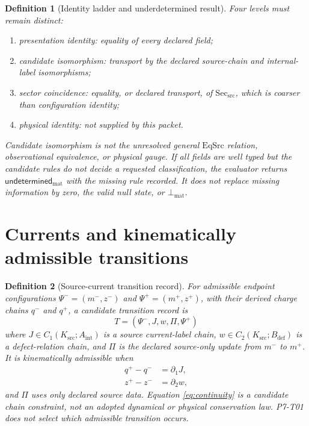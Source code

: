 \documentclass[11pt]{article}
\newtheorem{definition}{Definition}
\newcommand{\Ksrc}{K_{\mathrm{src}}}
\newcommand{\Aint}{A_{\mathrm{int}}}
\newcommand{\Bdef}{B_{\mathrm{def}}}
\newcommand{\Sect}{\mathrm{Sec}_{\mathrm{src}}}
\newcommand{\Malformed}{\bot_{\mathrm{mat}}}
\newcommand{\Undetermined}{\mathsf{undetermined}_{\mathrm{mat}}}
\begin{document}
\begin{definition}[Identity ladder and underdetermined result]
Four levels must remain distinct:
\begin{enumerate}[leftmargin=*]
\item \emph{presentation identity}: equality of every declared field;
\item \emph{candidate isomorphism}: transport by the declared source-chain
  and internal-label isomorphisms;
\item \emph{sector coincidence}: equality, or declared transport, of
  \(\Sect\), which is coarser than configuration identity;
\item \emph{physical identity}: not supplied by this packet.
\end{enumerate}
Candidate isomorphism is not the unresolved general
\(\mathrm{EqSrc}\) relation, observational equivalence, or physical gauge.
If all fields are well typed but the candidate rules do not decide a requested
classification, the evaluator returns \(\Undetermined\) with the missing rule
recorded. It does not replace missing information by zero, the valid null
state, or \(\Malformed\).
\end{definition}

\section{Currents and kinematically admissible transitions}

\begin{definition}[Source-current transition record]
For admissible endpoint configurations
\(\Psi^-=(m^-,z^-)\) and
\(\Psi^+=(m^+,z^+)\), with their derived charge chains \(q^-\) and
\(q^+\), a candidate transition record is
\[
  T=(\Psi^-,J,w,\Pi,\Psi^+)
\]
where \(J\in C_1(\Ksrc;\Aint)\) is a source current-label chain,
\(w\in C_2(\Ksrc;\Bdef)\) is a defect-relation chain, and \(\Pi\) is the
declared source-only update from \(m^-\) to \(m^+\).
It is kinematically admissible when
\begin{align}
  q^+-q^- &= \partial_1J,
    \label{eq:continuity}\\
  z^+-z^- &= \partial_2w,
    \label{eq:defect}
\end{align}
and \(\Pi\) uses only declared source data. Equation
\eqref{eq:continuity} is a candidate chain constraint, not an adopted
dynamical or physical conservation law. P7-T01 does not select which
admissible transition occurs.
\end{definition}
\end{document}
